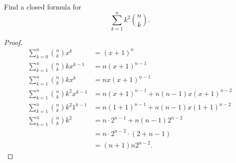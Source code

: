 \documentclass{article}
\begin{document}
Find a closed formula for
\[
	\sum_{k=1}^n k^2 \binom{n}{k}.
\]
\begin{proof}
	\begin{align*}
		\sum_{k=0}^{n} \binom{n}{k} x^k         & = {(x+1)}^n                             \\
		\sum_{k=1}^{n} \binom{n}{k} kx^{k-1}    & = n{(x+1)}^{n-1}                        \\
		\sum_{k=1}^{n} \binom{n}{k} kx^{k}      & = nx{(x+1)}^{n-1}                       \\
		\sum_{k=1}^{n} \binom{n}{k} k^2 x^{k-1} & = n{(x+1)}^{n-1}+n(n-1)x{(x + 1)}^{n-2} \\
		\sum_{k=1}^{n} \binom{n}{k} k^2 1^{k-1} & = n{(1+1)}^{n-1}+n(n-1)x{(1 + 1)}^{n-2} \\
		\sum_{k=1}^{n} \binom{n}{k} k^2         & = n\cdot 2^{n-1}+n(n-1)2^{n-2}          \\
		                                        & = n \cdot 2^{n-2}\cdot (2+n-1)          \\
		                                        & = (n+1)n 2^{n-2}
		.\end{align*}
\end{proof}
\end{document}
